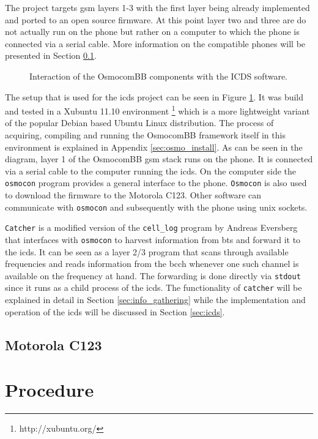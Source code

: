 The project targets \gls{gsm} layers 1-3 with the first layer being already implemented and ported to an open source firmware.
At this point layer two and three are do not actually run on the phone but rather on a computer to which the phone is connected via a serial cable.
More information on the compatible phones will be presented in Section \ref{sec:osmo_phones}.

\begin{figure}
\centering
\caption{Interaction of the OsmocomBB components with the ICDS software.}
\label{fig:osmo_setup}
\end{figure}

The setup that is used for the \gls{icds} project can be seen in Figure \ref{fig:osmo_setup}.
It was build and tested in a Xubuntu 11.10 environment \footnote{http://xubuntu.org/} which is a more lightweight variant of the popular Debian based Ubuntu Linux distribution.
The process of acquiring, compiling and running the OsmocomBB framework itself in this environment is explained in Appendix \ref{sec:osmo_install}.
As can be seen in the diagram, layer 1 of the OsmocomBB \gls{gsm} stack runs on the phone.
It is connected via a serial cable to the computer running the \gls{icds}.
On the computer side the \texttt{osmocon} program provides a general interface to the phone.
\texttt{Osmocon} is also used to download the firmware to the Motorola C123.
Other software can communicate with \texttt{osmocon} and subsequently with the phone using unix sockets.

\texttt{Catcher} is a modified version of the \texttt{cell\_log} program by Andreas Eversberg that interfaces with \texttt{osmocon} to harvest information from \gls{bts} and forward it to the \gls{icds}.
It can be seen as a layer 2/3 program that scans through available frequencies and reads information from the \gls{bcch} whenever one such channel is available on the frequency at hand.
The forwarding is done directly via \texttt{stdout} since it runs as a child process of the \gls{icds}.
The functionality of \texttt{catcher} will be explained in detail in Section \ref{sec:info_gathering} while the implementation and operation of the \gls{icds} will be discussed in Section \ref{sec:icds}.


\subsection{Motorola C123}
\label{sec:osmo_phones}

\section{Procedure}
